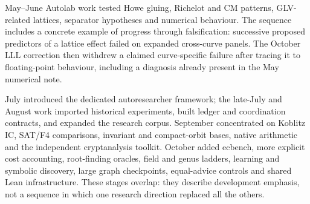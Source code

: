 May--June Autolab work tested Howe gluing, Richelot and CM patterns,
GLV-related lattices, separator hypotheses and numerical behaviour. The
sequence includes a concrete example of progress through falsification:
successive proposed predictors of a lattice effect failed on expanded
cross-curve panels. The October LLL correction then withdrew a claimed
curve-specific failure after tracing it to floating-point behaviour,
including a diagnosis already present in the May numerical note.

July introduced the dedicated autoresearcher framework; the late-July and
August work imported historical experiments, built ledger and coordination
contracts, and expanded the research corpus. September concentrated on
Koblitz IC, SAT/F4 comparisons, invariant and compact-orbit bases, native
arithmetic and the independent cryptanalysis toolkit. October added
ecbench, more explicit cost accounting, root-finding oracles, field and
genus ladders, learning and symbolic discovery, large graph checkpoints,
equal-advice controls and shared Lean infrastructure. These stages
overlap: they describe development emphasis, not a sequence in which one
research direction replaced all the others.
